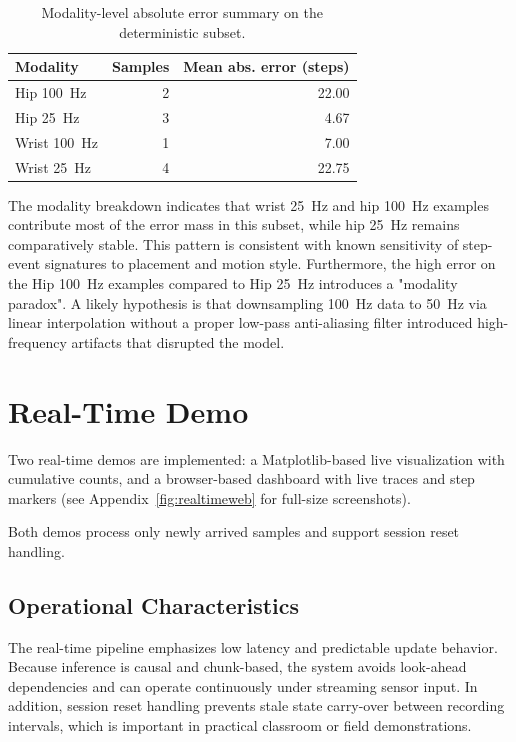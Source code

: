 \begin{table}[H]
\centering
\caption{Modality-level absolute error summary on the deterministic subset.}
\label{tab:modality_abs_error}
\small
\begin{tabular}{lrr}
\toprule
Modality & Samples & Mean abs. error (steps) \\
\midrule
Hip 100~Hz & 2 & 22.00 \\
Hip 25~Hz & 3 & 4.67 \\
Wrist 100~Hz & 1 & 7.00 \\
Wrist 25~Hz & 4 & 22.75 \\
\bottomrule
\end{tabular}
\end{table}

The modality breakdown indicates that wrist 25~Hz and hip 100~Hz examples contribute most of the error mass in this subset, while hip 25~Hz remains comparatively stable. This pattern is consistent with known sensitivity of step-event signatures to placement and motion style. Furthermore, the high error on the Hip 100~Hz examples compared to Hip 25~Hz introduces a "modality paradox". A likely hypothesis is that downsampling 100~Hz data to 50~Hz via linear interpolation without a proper low-pass anti-aliasing filter introduced high-frequency artifacts that disrupted the model.

\section{Real-Time Demo}
Two real-time demos are implemented: a Matplotlib-based live visualization with cumulative counts, and a browser-based dashboard with live traces and step markers (see Appendix~\ref{fig:realtimeweb} for full-size screenshots).

Both demos process only newly arrived samples and support session reset handling.

\subsection{Operational Characteristics}
The real-time pipeline emphasizes low latency and predictable update behavior. Because inference is causal and chunk-based, the system avoids look-ahead dependencies and can operate continuously under streaming sensor input. In addition, session reset handling prevents stale state carry-over between recording intervals, which is important in practical classroom or field demonstrations.

